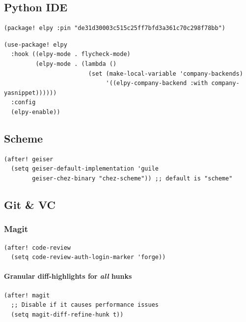 \documentclass[11pt]{article}
\begin{document}
\subsection{Python IDE}
\label{sec:org1aa322a}

\begin{verbatim}
(package! elpy :pin "de31d30003c515c25ff7bfd3a361c70c298f78bb")
\end{verbatim}

\begin{verbatim}
(use-package! elpy
  :hook ((elpy-mode . flycheck-mode)
         (elpy-mode . (lambda ()
                        (set (make-local-variable 'company-backends)
                             '((elpy-company-backend :with company-yasnippet))))))
  :config
  (elpy-enable))
\end{verbatim}

\subsection{Scheme}
\label{sec:org1a24b5d}

\begin{verbatim}
(after! geiser
  (setq geiser-default-implementation 'guile
        geiser-chez-binary "chez-scheme")) ;; default is "scheme"
\end{verbatim}

\subsection{Git \& VC}
\label{sec:org2bfc7f2}
\subsubsection{Magit}
\label{sec:orga77646c}

\begin{verbatim}
(after! code-review
  (setq code-review-auth-login-marker 'forge))
\end{verbatim}

\paragraph{Granular diff-highlights for \emph{all} hunks}
\label{sec:orgc060abd}

\begin{verbatim}
(after! magit
  ;; Disable if it causes performance issues
  (setq magit-diff-refine-hunk t))
\end{verbatim}
\end{document}
